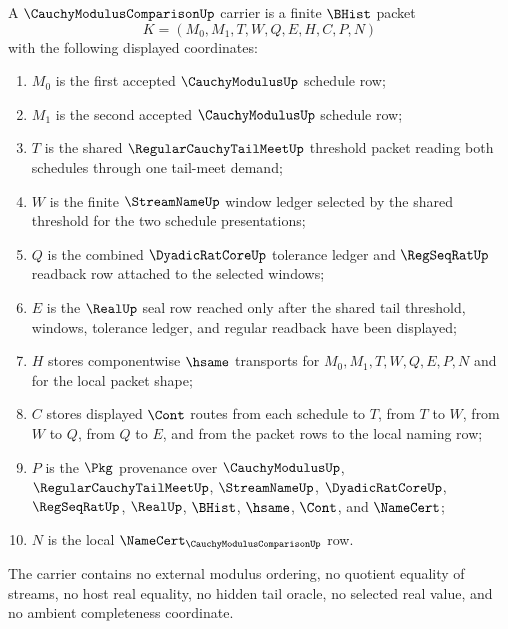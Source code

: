 \begin{definition}
\label{def:cauchy-modulus-comparison-carrier}
A $\CauchyModulusComparisonUp$ carrier is a finite $\BHist$ packet
$$
K=(M_0,M_1,T,W,Q,E,H,C,P,N)
$$
with the following displayed coordinates:
\begin{enumerate}
\item $M_0$ is the first accepted $\CauchyModulusUp$ schedule row;
\item $M_1$ is the second accepted $\CauchyModulusUp$ schedule row;
\item $T$ is the shared $\RegularCauchyTailMeetUp$ threshold packet reading both schedules through one tail-meet demand;
\item $W$ is the finite $\StreamNameUp$ window ledger selected by the shared threshold for the two schedule presentations;
\item $Q$ is the combined $\DyadicRatCoreUp$ tolerance ledger and $\RegSeqRatUp$ readback row attached to the selected windows;
\item $E$ is the $\RealUp$ seal row reached only after the shared tail threshold, windows, tolerance ledger, and regular readback have been displayed;
\item $H$ stores componentwise $\hsame$ transports for $M_0,M_1,T,W,Q,E,P,N$ and for the local packet shape;
\item $C$ stores displayed $\Cont$ routes from each schedule to $T$, from $T$ to $W$, from $W$ to $Q$, from $Q$ to $E$, and from the packet rows to the local naming row;
\item $P$ is the $\Pkg$ provenance over $\CauchyModulusUp$, $\RegularCauchyTailMeetUp$, $\StreamNameUp$, $\DyadicRatCoreUp$, $\RegSeqRatUp$, $\RealUp$, $\BHist$, $\hsame$, $\Cont$, and $\NameCert$;
\item $N$ is the local $\NameCert_{\CauchyModulusComparisonUp}$ row.
\end{enumerate}
The carrier contains no external modulus ordering, no quotient equality of streams, no host real equality, no hidden tail oracle, no selected real value, and no ambient completeness coordinate.
\end{definition}

